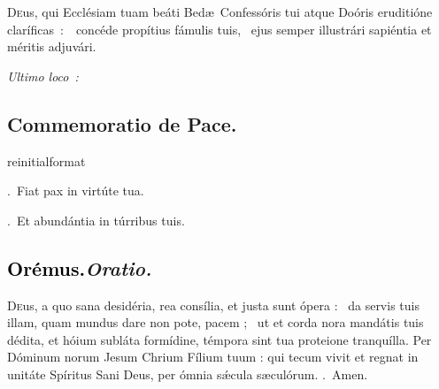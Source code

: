 \documentclass[12pt]{article} %
\newcommand{\myaboveinitial}[1]{%
    \expandafter\renewcommand\csname greinitialformat\endcsname[1]{%
        \fontsize{43}{43}\selectfont ##1
    }
    \gresetfirstlineaboveinitial{\textcolor{benred8}{\raisebox{6.0mm}{\small \textsc{\textbf{#1}}}}}{}
}
\newenvironment{rubric}{\vspace{1 mm}\color{benred8} \itshape \leftskip 0in \setlength{\parindent}{0.25in}}{\vspace{1 mm}}
\newenvironment{response}{\leftskip 0in \setlength{\parindent}{0in}}{\vspace{1 mm}}
\let\oldgresixstar\gresixstar
\renewcommand{\gresixstar}{\textcolor{benred8}{\oldgresixstar}}
\let\oldgredagger\gredagger
\renewcommand{\gredagger}{\textcolor{benred8}{\oldgredagger}}
\let\oldVbar\Vbar
\renewcommand{\Vbar}{\textcolor{benred8}{\oldVbar .}}
\let\oldRbar\Rbar
\renewcommand{\Rbar}{\textcolor{benred8}{\oldRbar .}}
\def\capitulumSpace{\hspace{20 mm}}
\begin{document}
\begin{response}\lettrine{D}{e}us, qui Eccl\'{e}siam tuam be\'{a}ti Bed\ae\ Confess\'{o}ris tui atque Do\'{o}ris eruditi\'{o}ne clar\'{i}ficas~:~\gredagger\ conc\'{e}de prop\'{i}tius f\'{a}mulis tuis, \gresixstar\ ejus semper illustr\'{a}ri sapi\'{e}ntia et m\'{e}ritis adjuv\'{a}ri.

\end{response}

\begin{rubric}
Ultimo loco~:

\end{rubric}



\subsection*{Commemoratio de Pace.}


\myaboveinitial{II}

\begin{response}
\Vbar\ Fiat pax in virt\'{u}te tua.

\Rbar\ Et abund\'{a}ntia in t\'{u}rribus tuis.

\end{response}

\subsection*{\textcolor{black}{Or\'{e}mus.}\capitulumSpace \emph{Oratio.}}

\begin{response}\lettrine{D}{e}us, a quo sana desid\'{e}ria, rea cons\'{i}lia, et justa sunt \'{o}pera : \gredagger\ da servis tuis illam, quam mundus dare non pote, pacem ; \gresixstar\ ut et corda nora mand\'{a}tis tuis d\'{e}dita, et h\'{o}ium subl\'{a}ta form\'{i}dine, t\'{e}mpora sint tua proteione tranqu\'{i}lla. Per D\'{o}minum norum Jesum Chrium F\'{i}lium tuum : qui tecum vivit et regnat in unit\'{a}te Sp\'{i}ritus Sani Deus, per \'{o}mnia s\'{\ae}cula s\ae cul\'{o}rum. \Rbar\ Amen.

\end{response}
\end{document}
